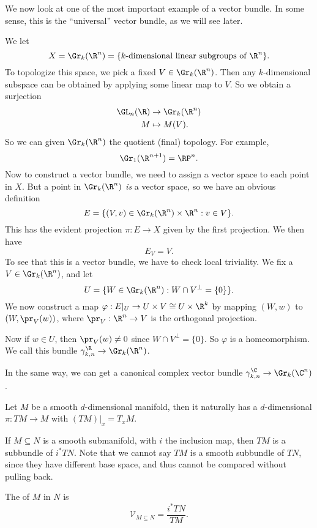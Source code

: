 \documentclass[a4paper]{article}
\begin{document}
We now look at one of the most important example of a vector bundle. In some sense, this is the ``universal'' vector bundle, as we will see later.
\begin{eg}
  We let
  \[
    X = \Gr_k(\R^n) = \{k\text{-dimensional linear subgroups of $\R^n$}\}.
  \]
  To topologize this space, we pick a fixed $V \in \Gr_k(\R^n)$. Then any $k$-dimensional subspace can be obtained by applying some linear map to $V$. So we obtain a surjection
  \begin{align*}
    \GL_n(\R) &\to \Gr_k(\R^n)\\
    M &\mapsto M(V).
  \end{align*}
  So we can given $\Gr_k(\R^n)$ the quotient (final) topology. For example,
  \[
    \Gr_1(\R^{n + 1}) = \RP^n.
  \]
  Now to construct a vector bundle, we need to assign a vector space to each point in $X$. But a point in $\Gr_k(\R^n)$ \emph{is} a vector space, so we have an obvious definition
  \[
    E = \{(V, v) \in \Gr_k(\R^n) \times \R^n: v \in V\}.
  \]
  This has the evident projection $\pi: E \to X$ given by the first projection. We then have
  \[
    E_V = V.
  \]
  To see that this is a vector bundle, we have to check local triviality. We fix a $V \in \Gr_k(\R^n)$, and let
  \[
    U = \{W \in\Gr_k(\R^n): W \cap V^\perp = \{0\}\}.
  \]
  We now construct a map $\varphi: E|_U \to U \times V \cong U \times \R^k$ by mapping $(W, w)$ to $(W, \pr_V(w))$, where $\pr_V: \R^n \to V$ is the orthogonal projection.

  Now if $w \in U$, then $\pr_V(w) \not= 0$ since $W \cap V^\perp = \{0\}$. So $\varphi$ is a homeomorphism. We call this bundle $\gamma_{k, n}^\R \to \Gr_k(\R^n)$.

  In the same way, we can get a canonical complex vector bundle $\gamma_{k, n}^\C \to \Gr_k(\C^n)$.
\end{eg}


\begin{eg}
  Let $M$ be a smooth $d$-dimensional manifold, then it naturally has a $d$-dimensional  $\pi: TM \to M$ with $(TM)|_x = T_x M$.

  If $M \subseteq N$ is a smooth submanifold, with $i$ the inclusion map, then $TM$ is a subbundle of $i^* TN$. Note that we cannot say $TM$ is a smooth subbundle of $TN$, since they have different base space, and thus cannot be compared without pulling back.

  The  of $M$ in $N$ is
  \[
    \mathcal{V}_{M \subseteq N} = \frac{i^* TN}{TM}.
  \]
\end{eg}
\end{document}
